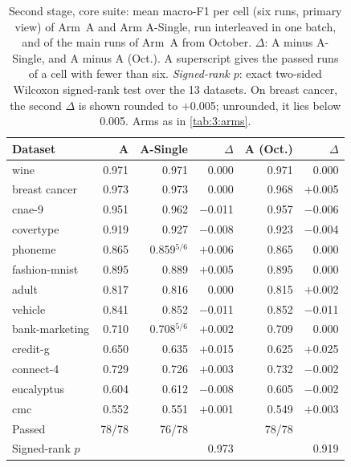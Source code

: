 \begin{table}[htbp]
  \centering
  \small
  \caption[Second stage: F1 per cell, A and A-Single]{Second stage, core suite: mean macro-F1 per cell (six runs, primary view) of Arm~A and Arm A-Single, run interleaved in one batch, and of the main runs of Arm~A from October. $\Delta$: A minus A-Single, and A minus A (Oct.). A superscript gives the passed runs of a cell with fewer than six. \emph{Signed-rank $p$}: exact two-sided Wilcoxon signed-rank test over the 13 datasets. On breast cancer, the second $\Delta$ is shown rounded to $+$0.005; unrounded, it lies below 0.005. Arms as in \autoref{tab:3:arms}.}
  \label{tab:6:h1}
  \begin{tabular}{lrrrrr}
    \toprule
    Dataset & A & A-Single & $\Delta$ & A (Oct.) & $\Delta$ \\
    \midrule
    wine & 0.971 & 0.971 & 0.000 & 0.971 & 0.000 \\
    breast cancer & 0.973 & 0.973 & 0.000 & 0.968 & $+$0.005 \\
    cnae-9 & 0.951 & 0.962 & $-$0.011 & 0.957 & $-$0.006 \\
    covertype & 0.919 & 0.927 & $-$0.008 & 0.923 & $-$0.004 \\
    phoneme & 0.865 & 0.859$^{5/6}$ & $+$0.006 & 0.865 & 0.000 \\
    fashion-mnist & 0.895 & 0.889 & $+$0.005 & 0.895 & 0.000 \\
    adult & 0.817 & 0.816 & 0.000 & 0.815 & $+$0.002 \\
    vehicle & 0.841 & 0.852 & $-$0.011 & 0.852 & $-$0.011 \\
    bank-marketing & 0.710 & 0.708$^{5/6}$ & $+$0.002 & 0.709 & 0.000 \\
    credit-g & 0.650 & 0.635 & $+$0.015 & 0.625 & $+$0.025 \\
    connect-4 & 0.729 & 0.726 & $+$0.003 & 0.732 & $-$0.002 \\
    eucalyptus & 0.604 & 0.612 & $-$0.008 & 0.605 & $-$0.002 \\
    cmc & 0.552 & 0.551 & $+$0.001 & 0.549 & $+$0.003 \\
    \midrule
    Passed & 78/78 & 76/78 &  & 78/78 &  \\
    Signed-rank $p$ &  &  & 0.973 &  & 0.919 \\
    \bottomrule
  \end{tabular}
\end{table}
